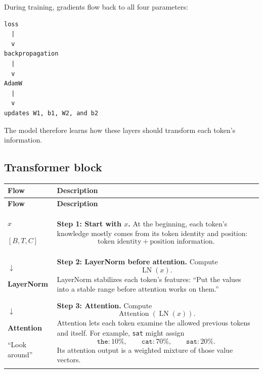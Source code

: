 During training, gradients flow back to all four parameters:
\begin{lstlisting}[style=shadedpython,language={}]
loss
  |
  v
backpropagation
  |
  v
AdamW
  |
  v
updates W1, b1, W2, and b2
\end{lstlisting}
The model therefore learns how these layers should transform each token's
information.



\subsection{Transformer block}


\begingroup
\small
\renewcommand{\arraystretch}{1.25}
\begin{longtable}{@{}p{}p{}@{}}
  \textbf{Flow} & \textbf{Description} \\
  \hline
  \endfirsthead
  \textbf{Flow} & \textbf{Description} \\
  \hline
  \endhead

  {\centering\sffamily\bfseries
    \(x\)\par
    \([B,T,C]\)\par}
  &
  \textbf{Step 1: Start with \(x\).}
  At the beginning, each token's knowledge mostly comes from its token
  identity and position:
  \[
    \text{token identity}+\text{position information}.
  \]
  \\

  {\centering\sffamily
    \(\downarrow\)\par
    \textbf{LayerNorm}\par}
  &
  \textbf{Step 2: LayerNorm before attention.}
  Compute
  \[
    \operatorname{LN}(x).
  \]
  LayerNorm stabilizes each token's features: ``Put the values into a stable
  range before attention works on them.''
  \\

  {\centering\sffamily
    \(\downarrow\)\par
    \textbf{Attention}\par
    ``Look around''\par}
  &
  \textbf{Step 3: Attention.}
  Compute
  \[
    \operatorname{Attention}\!\left(\operatorname{LN}(x)\right).
  \]
  Attention lets each token examine the allowed previous tokens and itself.
  For example, \texttt{sat} might assign
  \[
    \texttt{the}:10\%,\qquad
    \texttt{cat}:70\%,\qquad
    \texttt{sat}:20\%.
  \]
  Its attention output is a weighted mixture of those value vectors.
  \\


\end{longtable}
